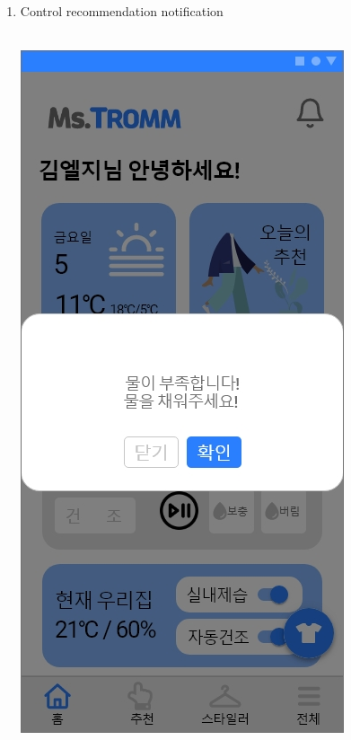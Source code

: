 \documentclass[conference]{IEEEtran}
\begin{document}
\begin{enumerate}
    \item Control recommendation notification \\ \\
        \begin{itemize}
        \centerline{\includegraphics[scale=0.24]{assets/제어추천 팝업1.jpg}
}
\end{itemize}
\end{enumerate}
\end{document}
